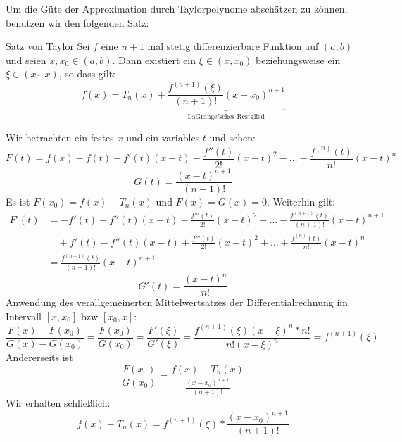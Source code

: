 Um die Güte der Approximation durch Taylorpolynome abschätzen zu können, benutzen wir den folgenden Satz:
\begin{satz}{Satz von Taylor}
Sei $f$ eine $n+1$ mal stetig differenzierbare Funktion auf $(a,b)$ und seien $x,x_0\in(a,b)$. Dann existiert ein $\xi\in(x,x_0)$ beziehungsweise ein $\xi\in(x_0,x)$, so dass gilt:
\begin{equation*}
	f(x)=T_n(x)+\underbrace{\frac{f^{(n+1)}(\xi)}{(n+1)!}(x-x_0)^{n+1}}_{\text{LaGrange'sches Restglied}}
\end{equation*}
\end{satz}
\beweis
Wir betrachten ein festes $x$ und ein variables $t$ und sehen:
\begin{equation*}
	F(t)=f(x)-f(t)-f'(t)(x-t)-\frac{f''(t)}{2!}(x-t)^2-\ldots-\frac{f^{(n)}(t)}{n!}(x-t)^n
\end{equation*}
\begin{equation*}
	G(t)=\frac{(x-t)^{n+1}}{(n+1)!}
\end{equation*}
Es ist $F(x_0)=f(x)-T_n(x)$ und $F(x)=G(x)=0$. Weiterhin gilt:
\begin{align*}
	F'(t)&=-f'(t)-f''(t)(x-t)-\frac{f'''(t)}{2!}(x-t)^2-\ldots-\frac{f^{(n+1)}(t)}{(n+1)!}(x-t)^{n+1}\\
		&\quad +f'(t)-f''(t)(x-t)+\frac{f'''(t)}{2!}(x-t)^2+\ldots+\frac{f^{(n)}(t)}{n!}(x-t)^{n}\\
		&=\frac{f^{(n+1)}(t)}{(n+1)!}(x-t)^{n+1}
\end{align*}
\begin{equation*}
	G'(t)=\frac{(x-t)^n}{n!}
\end{equation*}
Anwendung des verallgemeinerten Mittelwertsatzes der Differentialrechnung im Intervall $[x,x_0]$ bzw $[x_0,x]$:
\begin{equation*}
\frac{F(x)-F(x_0)}{G(x)-G(x_0)}=\frac{F(x_0)}{G(x_0)}=\frac{F'(\xi)}{G'(\xi)}=\frac{f^{(n+1)}(\xi)(x-\xi)^n*n!}{n!(x-\xi)^n}=f^{(n+1)}(\xi)
\end{equation*}
Andererseits ist
\begin{equation*}
	\frac{F(x_0)}{G(x_0)}=\frac{f(x)-T_n(x)}{\frac{(x-x_0)^{n+1}}{(n+1)!}}
\end{equation*}
Wir erhalten schließlich:
\begin{equation*}
	f(x)-T_n(x)=f^{(n+1)}(\xi)*\frac{(x-x_0)^{n+1}}{(n+1)!}
\end{equation*}



